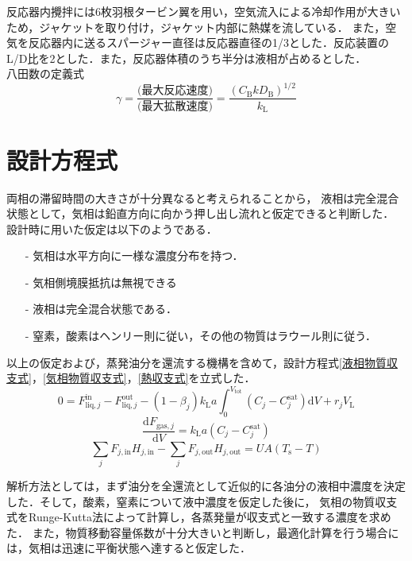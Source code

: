 \documentclass[a4j]{jsreport}
\newcommand{\diff}{\mathrm{d}}
\begin{document}
反応器内攪拌には6枚羽根タービン翼を用い，空気流入による冷却作用が大きいため，ジャケットを取り付け，ジャケット内部に熱媒を流している．
また，空気を反応器内に送るスパージャー直径は反応器直径の1/3とした．反応装置のL/D比を2とした．また，反応器体積のうち半分は液相が占めるとした．\\

八田数の定義式
\begin{equation}
    \gamma = \frac{\text{(最大反応速度)}}{\text{(最大拡散速度)}} = \frac{(C_\mathrm{B} k D_\mathrm{B})^{1/2}}{k_\mathrm{L}}
\end{equation}

\section{設計方程式}
両相の滞留時間の大きさが十分異なると考えられることから，
液相は完全混合状態として，気相は鉛直方向に向かう押し出し流れと仮定できると判断した．
設計時に用いた仮定は以下のようである．
\begin{itemize}
    \item[-] 気相は水平方向に一様な濃度分布を持つ．
    \item[-] 気相側境膜抵抗は無視できる
    \item[-] 液相は完全混合状態である．
    \item[-] 窒素，酸素はヘンリー則に従い，その他の物質はラウール則に従う．
\end{itemize}
以上の仮定および，蒸発油分を還流する機構を含めて，設計方程式\eqref{液相物質収支式}，\eqref{気相物質収支式}，\eqref{熱収支式}を立式した．
\begin{equation}
    \label{液相物質収支式}
    0 = F^\text{in}_{\text{liq},j} - F^\text{out}_{\text{liq},j} - (1 - \beta_j) k_\mathrm{L} a \int^{V_\text{tot}}_0(C_j - C^\text{sat}_j) \diff V + r_j V_\mathrm{L}
\end{equation}
\begin{equation}
    \label{気相物質収支式}
    \frac{\diff F_{\text{gas},j}}{\diff V} = k_\mathrm{L} a (C_j - C^\text{sat}_j)
\end{equation}
\begin{equation}
    \label{熱収支式}
    \sum_jF_{j,\mathrm{in}}H_{j,\mathrm{in}}-\sum_jF_{j,\text{out}}H_{j,\text{out}} = UA(T_\mathrm{s}-T)
\end{equation}

解析方法としては，まず油分を全還流として近似的に各油分の液相中濃度を決定した．そして，酸素，窒素について液中濃度を仮定した後に，
気相の物質収支式をRunge-Kutta法によって計算し，各蒸発量が収支式と一致する濃度を求めた．
また，物質移動容量係数が十分大きいと判断し，最適化計算を行う場合には，気相は迅速に平衡状態へ達すると仮定した．
\end{document}
